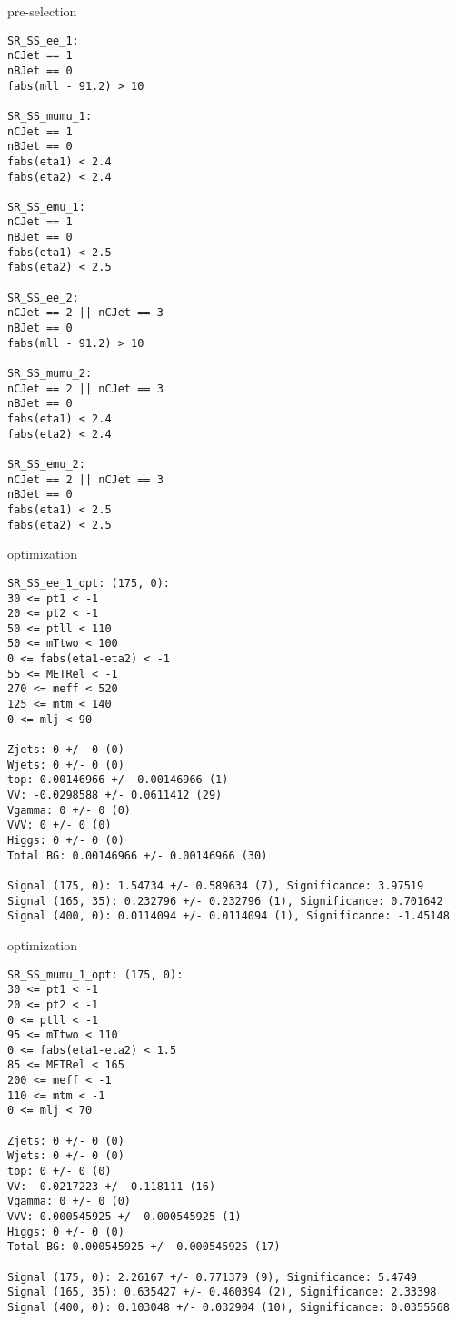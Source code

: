 \begin{frame}[fragile]{pre-selection}
\tiny
\begin{verbatim}
SR_SS_ee_1:
nCJet == 1
nBJet == 0
fabs(mll - 91.2) > 10

SR_SS_mumu_1:
nCJet == 1
nBJet == 0
fabs(eta1) < 2.4
fabs(eta2) < 2.4

SR_SS_emu_1:
nCJet == 1
nBJet == 0
fabs(eta1) < 2.5
fabs(eta2) < 2.5

SR_SS_ee_2:
nCJet == 2 || nCJet == 3
nBJet == 0
fabs(mll - 91.2) > 10

SR_SS_mumu_2:
nCJet == 2 || nCJet == 3
nBJet == 0
fabs(eta1) < 2.4
fabs(eta2) < 2.4

SR_SS_emu_2:
nCJet == 2 || nCJet == 3
nBJet == 0
fabs(eta1) < 2.5
fabs(eta2) < 2.5
\end{verbatim}
\end{frame}



\begin{frame}[fragile]{optimization}
\tiny
\begin{verbatim}
SR_SS_ee_1_opt: (175, 0):
30 <= pt1 < -1
20 <= pt2 < -1
50 <= ptll < 110
50 <= mTtwo < 100
0 <= fabs(eta1-eta2) < -1
55 <= METRel < -1
270 <= meff < 520
125 <= mtm < 140
0 <= mlj < 90

Zjets: 0 +/- 0 (0)
Wjets: 0 +/- 0 (0)
top: 0.00146966 +/- 0.00146966 (1)
VV: -0.0298588 +/- 0.0611412 (29)
Vgamma: 0 +/- 0 (0)
VVV: 0 +/- 0 (0)
Higgs: 0 +/- 0 (0)
Total BG: 0.00146966 +/- 0.00146966 (30)

Signal (175, 0): 1.54734 +/- 0.589634 (7), Significance: 3.97519
Signal (165, 35): 0.232796 +/- 0.232796 (1), Significance: 0.701642
Signal (400, 0): 0.0114094 +/- 0.0114094 (1), Significance: -1.45148
\end{verbatim}
\end{frame}

\begin{frame}[fragile]{optimization}
\tiny
\begin{verbatim}
SR_SS_mumu_1_opt: (175, 0):
30 <= pt1 < -1
20 <= pt2 < -1
0 <= ptll < -1
95 <= mTtwo < 110
0 <= fabs(eta1-eta2) < 1.5
85 <= METRel < 165
200 <= meff < -1
110 <= mtm < -1
0 <= mlj < 70

Zjets: 0 +/- 0 (0)
Wjets: 0 +/- 0 (0)
top: 0 +/- 0 (0)
VV: -0.0217223 +/- 0.118111 (16)
Vgamma: 0 +/- 0 (0)
VVV: 0.000545925 +/- 0.000545925 (1)
Higgs: 0 +/- 0 (0)
Total BG: 0.000545925 +/- 0.000545925 (17)

Signal (175, 0): 2.26167 +/- 0.771379 (9), Significance: 5.4749
Signal (165, 35): 0.635427 +/- 0.460394 (2), Significance: 2.33398
Signal (400, 0): 0.103048 +/- 0.032904 (10), Significance: 0.0355568
\end{verbatim}
\end{frame}

